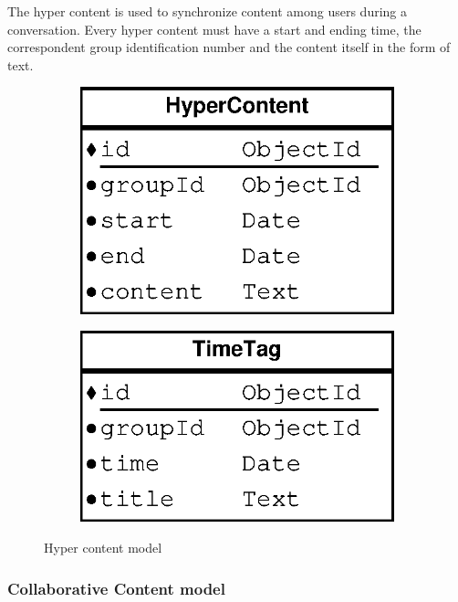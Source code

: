 The hyper content is used to synchronize content among users during a conversation. Every hyper content must have a start and ending time, the correspondent group identification number and the content itself in the form of text.

\begin{figure}[H]
    \centering
    \begin{subfigure}[b]{0.3\textwidth}
    	\includegraphics[width=\textwidth]{figures/model_hyper_content}
    \end{subfigure}
    \begin{subfigure}[b]{0.3\textwidth}
    	\includegraphics[width=\textwidth]{figures/model_time_tag}
    \end{subfigure}    
    \caption{Hyper content model}
\end{figure} 

\subsubsection{Collaborative Content model}

